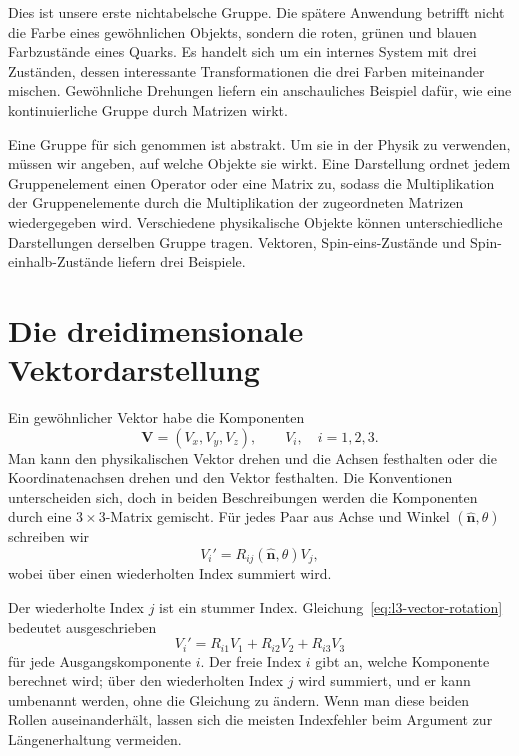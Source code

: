 Dies ist unsere erste nichtabelsche Gruppe. Die spätere Anwendung betrifft nicht die Farbe eines gewöhnlichen Objekts, sondern die roten, grünen und blauen Farbzustände eines Quarks. Es handelt sich um ein internes System mit drei Zuständen, dessen interessante Transformationen die drei Farben miteinander mischen. Gewöhnliche Drehungen liefern ein anschauliches Beispiel dafür, wie eine kontinuierliche Gruppe durch Matrizen wirkt.

Eine Gruppe für sich genommen ist abstrakt. Um sie in der Physik zu verwenden, müssen wir angeben, auf welche Objekte sie wirkt. Eine {Darstellung} ordnet jedem Gruppenelement einen Operator oder eine Matrix zu, sodass die Multiplikation der Gruppenelemente durch die Multiplikation der zugeordneten Matrizen wiedergegeben wird. Verschiedene physikalische Objekte können unterschiedliche Darstellungen derselben Gruppe tragen. Vektoren, Spin-eins-Zustände und Spin-einhalb-Zustände liefern drei Beispiele.

\section{Die dreidimensionale Vektordarstellung}

Ein gewöhnlicher Vektor habe die Komponenten
\begin{equation}
\boldsymbol V=(V_x,V_y,V_z),\qquad V_i,\quad i=1,2,3.
\end{equation}
Man kann den physikalischen Vektor drehen und die Achsen festhalten oder die Koordinatenachsen drehen und den Vektor festhalten. Die Konventionen unterscheiden sich, doch in beiden Beschreibungen werden die Komponenten durch eine \(3\times3\)-Matrix gemischt. Für jedes Paar aus Achse und Winkel \((\hat{\boldsymbol n},\theta)\) schreiben wir
\begin{equation}
V_i'=R_{ij}(\hat{\boldsymbol n},\theta)V_j,
\label{eq:l3-vector-rotation}
\end{equation}
wobei über einen wiederholten Index summiert wird.

Der wiederholte Index \(j\) ist ein stummer Index. Gleichung~\eqref{eq:l3-vector-rotation} bedeutet ausgeschrieben
\begin{equation}
V_i'=R_{i1}V_1+R_{i2}V_2+R_{i3}V_3
\end{equation}
für jede Ausgangskomponente \(i\). Der freie Index \(i\) gibt an, welche Komponente berechnet wird; über den wiederholten Index \(j\) wird summiert, und er kann umbenannt werden, ohne die Gleichung zu ändern. Wenn man diese beiden Rollen auseinanderhält, lassen sich die meisten Indexfehler beim Argument zur Längenerhaltung vermeiden.

